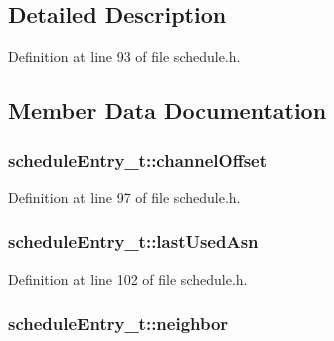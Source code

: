 \subsection{Detailed Description}


Definition at line 93 of file schedule.\+h.



\subsection{Member Data Documentation}
\subsubsection[{\texorpdfstring{channel\+Offset}{channelOffset}}]{ schedule\+Entry\+\_\+t\+::channel\+Offset}\hypertarget{structschedule_entry__t_aa969962bcdc2e067da69170415226c11}{}\label{structschedule_entry__t_aa969962bcdc2e067da69170415226c11}


Definition at line 97 of file schedule.\+h.

\subsubsection[{\texorpdfstring{last\+Used\+Asn}{lastUsedAsn}}]{ schedule\+Entry\+\_\+t\+::last\+Used\+Asn}\hypertarget{structschedule_entry__t_a3b05fd86dfceedf5bb49662089ee7405}{}\label{structschedule_entry__t_a3b05fd86dfceedf5bb49662089ee7405}


Definition at line 102 of file schedule.\+h.

\subsubsection[{\texorpdfstring{neighbor}{neighbor}}]{ schedule\+Entry\+\_\+t\+::neighbor}\hypertarget{structschedule_entry__t_a52208142c72b2c5b9ba473b3ddd51909}{}\label{structschedule_entry__t_a52208142c72b2c5b9ba473b3ddd51909}



